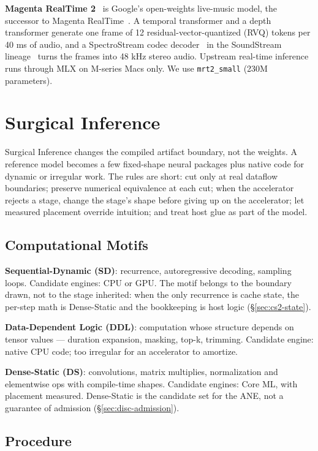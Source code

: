 \documentclass[11pt]{article}
\newcommand{\code}[1]{\texttt{#1}}
\begin{document}
\textbf{Magenta RealTime 2}~\citep{mrt2,mrt2-model-card,magenta-rt-repo} is Google's open-weights live-music model, the successor to Magenta RealTime~\citep{magenta-rt}. A temporal transformer and a depth transformer generate one frame of 12 residual-vector-quantized (RVQ) tokens per 40 ms of audio, and a SpectroStream codec decoder~\citep{spectrostream} in the SoundStream lineage~\citep{soundstream} turns the frames into 48 kHz stereo audio. Upstream real-time inference runs through MLX on M-series Macs only. We use \code{mrt2\_small} (230M parameters).

\section{Surgical Inference}\label{sec:method}

Surgical Inference changes the compiled artifact boundary, not the weights. A reference model becomes a few fixed-shape neural packages plus native code for dynamic or irregular work. The rules are short: cut only at real dataflow boundaries; preserve numerical equivalence at each cut; when the accelerator rejects a stage, change the stage's shape before giving up on the accelerator; let measured placement override intuition; and treat host glue as part of the model.

\subsection{Computational Motifs}\label{sec:motifs}

\textbf{Sequential-Dynamic (SD)}: recurrence, autoregressive decoding, sampling loops. Candidate engines: CPU or GPU. The motif belongs to the boundary drawn, not to the stage inherited: when the only recurrence is cache state, the per-step math is Dense-Static and the bookkeeping is host logic (\S\ref{sec:cs2-state}).

\textbf{Data-Dependent Logic (DDL)}: computation whose structure depends on tensor values --- duration expansion, masking, top-k, trimming. Candidate engine: native CPU code; too irregular for an accelerator to amortize.

\textbf{Dense-Static (DS)}: convolutions, matrix multiplies, normalization and elementwise ops with compile-time shapes. Candidate engines: Core ML, with placement measured. Dense-Static is the candidate set for the ANE, not a guarantee of admission (\S\ref{sec:disc-admission}).

\subsection{Procedure}\label{sec:procedure}
\end{document}

